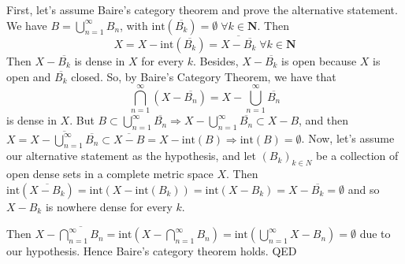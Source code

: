 \documentclass[12pt]{article}
\begin{document}
First, let's assume Baire's category theorem and prove the alternative statement.\newline
We have $B=\bigcup_{n=1}^\infty B_n$, with $\textrm{int}(\overline{B_k}) = \emptyset \; \forall k \in \mathbf{N}$.\newline
Then \[
    X=X-\textrm{int}(\overline{B_k})=\overline{X-\overline{B_k}}\;\forall k \in \mathbf{N}\]
    Then $X-\overline{B_k}$ is dense in $X$ for every $k$. Besides, $X-\overline{B_k}$ is open because $X$ is open and
    $\overline{B_k}$ closed. So, by Baire's Category Theorem, we have that
    \[
    \bigcap_{n=1}^\infty (X-\overline{B_n})=X-\bigcup_{n=1}^\infty \overline{B_n}
    \] is dense in $X$.
    But $B\subset\bigcup_{n=1}^\infty \overline{B_n} \Longrightarrow X-\bigcup_{n=1}^\infty \overline{B_n} \subset X-B$, and then
    $X=\overline{X-\bigcup_{n=1}^\infty \overline{B_n}} \subset \overline{X-B}=X-\textrm{int}(B) \Longrightarrow \textrm{int}(B)=\emptyset$.
\newline
\newline
Now, let's assume our alternative statement as the hypothesis, and let $(B_k)_{k\in N}$ be a collection of open dense sets in
a complete metric space $X$.
Then $\textrm{int}(\overline{X-B_k})=\textrm{int}(X-\textrm{int}(B_k))=\textrm{int}(X-B_k)=X-\overline{B_k}=\emptyset$ and so
$X-B_k$ is nowhere dense for every $k$.\newline

Then $X-\overline{\bigcap_{n=1}^\infty B_n} =
\textrm{int}(X-\bigcap_{n=1}^\infty B_n) =
\textrm{int}(\bigcup_{n=1}^\infty X-B_n) = \emptyset$ due to our hypothesis. Hence Baire's category theorem holds.
\newline
QED
\end{document}
